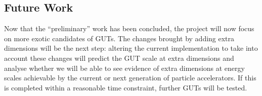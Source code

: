 \documentclass[12pt,a4paper,oneside]{article}
\begin{document}
\subsection{Future Work}
Now that the ``preliminary'' work has been concluded, the project will now focus on more exotic candidates of GUTs. The changes brought by adding extra dimensions \cite{extra-dims} will be the next step: altering the current implementation to take into account these changes will predict the GUT scale at extra dimensions and analyse whether we will be able to see evidence of extra dimensions at energy scales achievable by the current or next generation of particle accelerators. If this is completed within a reasonable time constraint, further GUTs will be tested.

\singlespace
\end{document}
